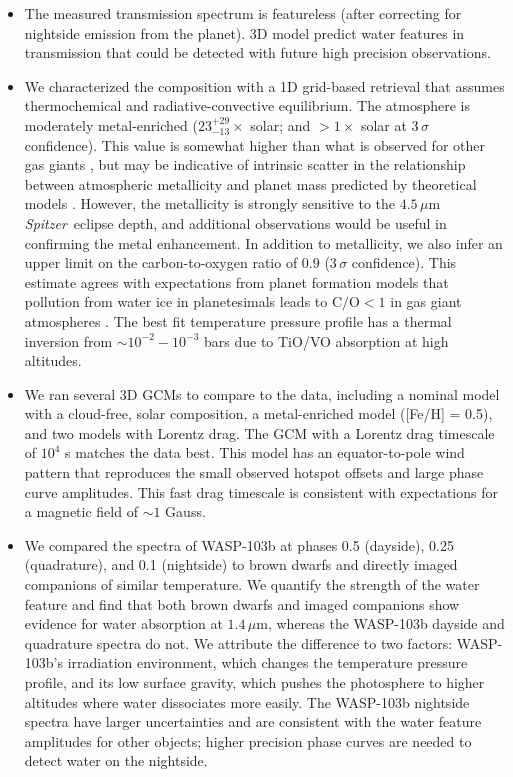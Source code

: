\documentclass[twocolumn]{aastex61}
\newcommand{\project}[1]{\textsl{#1}}
\newcommand{\Spitzer}{\project{Spitzer}}
\begin{document}
\begin{itemize}
\item{The measured transmission spectrum is featureless (after correcting for nightside emission from the planet). 3D model predict water features in transmission that could be detected with future high precision observations.}
	\item{We characterized the composition with a 1D grid-based retrieval that assumes thermochemical and radiative-convective equilibrium. The atmosphere is moderately metal-enriched ($23^{+29}_{-13}\times$ solar; and $>1\times$ solar at $3\,\sigma$ confidence). This value is somewhat higher than what is observed for other gas giants \citep[e.g.][]{wong04, kreidberg14b}, but may be indicative of intrinsic scatter in the relationship between atmospheric metallicity and planet mass predicted by theoretical models \citep{fortney13, mordasini16}. However, the metallicity is strongly sensitive to the $4.5\,\mu$m \Spitzer\ eclipse depth, and additional observations would be useful in confirming the metal enhancement.  In addition to metallicity, we also infer an upper limit on the carbon-to-oxygen ratio of 0.9 ($3\,\sigma$ confidence). This estimate agrees with expectations from planet formation models that pollution from water ice in planetesimals leads to $\mathrm{C/O} < 1$ in gas giant atmospheres \citep{mordasini16, espinoza17}. The best fit temperature pressure profile has a thermal inversion from $\sim10^{-2} - 10^{-3}$ bars due to TiO/VO absorption at high altitudes.} 
	\item{We ran several 3D GCMs to compare to the data, including a nominal model with a cloud-free, solar composition, a metal-enriched model ([Fe/H] = 0.5), and two models with Lorentz drag. The GCM with a Lorentz drag timescale of $10^4$ s matches the data best. This model has an equator-to-pole wind pattern that reproduces the small observed hotspot offsets and large phase curve amplitudes. This fast drag timescale is consistent with expectations for a magnetic field of $\sim1$ Gauss.} 
	\item{We compared the spectra of WASP-103b at phases 0.5 (dayside), 0.25 (quadrature), and 0.1 (nightside) to brown dwarfs and directly imaged companions of similar temperature. We quantify the strength of the water feature and find that both brown dwarfs and imaged companions show evidence for water absorption at $1.4\,\mu$m, whereas the WASP-103b dayside and quadrature spectra do not. We attribute the difference to two factors: WASP-103b's irradiation environment, which changes the temperature pressure profile, and its low surface gravity, which pushes the photosphere to higher altitudes where water dissociates more easily. The WASP-103b nightside spectra have larger uncertainties and are consistent with the water feature amplitudes for other objects; higher precision phase curves are needed to detect water on the nightside.}
\end{itemize}
\end{document}
